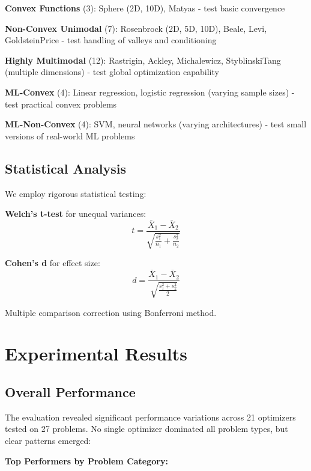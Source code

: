 \textbf{Convex Functions} (3): Sphere (2D, 10D), Matyas - test basic convergence

\textbf{Non-Convex Unimodal} (7): Rosenbrock (2D, 5D, 10D), Beale, Levi, GoldsteinPrice - test handling of valleys and conditioning

\textbf{Highly Multimodal} (12): Rastrigin, Ackley, Michalewicz, StyblinskiTang (multiple dimensions) - test global optimization capability

\textbf{ML-Convex} (4): Linear regression, logistic regression (varying sample sizes) - test practical convex problems

\textbf{ML-Non-Convex} (4): SVM, neural networks (varying architectures) - test small versions of real-world ML problems

\hypertarget{statistical-analysis}{%
\subsection{Statistical Analysis}\label{statistical-analysis}}

We employ rigorous statistical testing:

\textbf{Welch's t-test} for unequal variances:
\[t = \frac{\bar{X}_1 - \bar{X}_2}{\sqrt{\frac{s_1^2}{n_1} + \frac{s_2^2}{n_2}}}\]

\textbf{Cohen's d} for effect size:
\[d = \frac{\bar{X}_1 - \bar{X}_2}{\sqrt{\frac{s_1^2 + s_2^2}{2}}}\]

Multiple comparison correction using Bonferroni method.

\hypertarget{experimental-results}{%
\section{Experimental Results}\label{experimental-results}}

\hypertarget{overall-performance}{%
\subsection{Overall Performance}\label{overall-performance}}

The evaluation revealed significant performance variations across 21 optimizers tested on 27 problems. No single optimizer dominated all problem types, but clear patterns emerged:

\textbf{Top Performers by Problem Category:}

